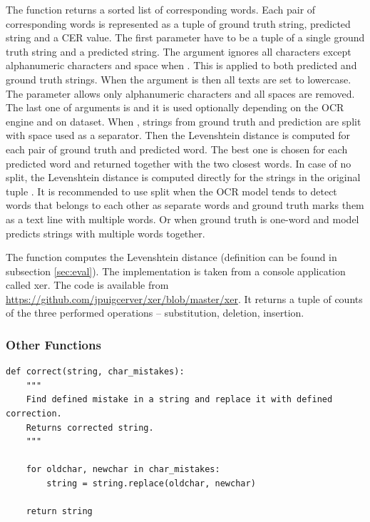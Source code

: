 The function  returns a sorted list of corresponding words. Each pair of corresponding words is represented as a tuple of ground truth string, predicted string and a CER value. The first parameter have to be a tuple of a single ground truth string and a predicted string. The argument  ignores all characters except alphanumeric characters and space when . This is applied to both predicted and ground truth strings. When the argument  is  then all texts are set to lowercase. The  parameter allows only alphanumeric characters and all spaces are removed. The last one of arguments is  and it is used optionally depending on the OCR engine and on dataset. When , strings from ground truth and prediction are split with space used as a separator. Then the Levenshtein distance is computed for each pair of ground truth and predicted word. The best one is chosen for each predicted word and returned together with the two closest words. In case of no split, the Levenshtein distance is computed directly for the strings in the original tuple . It is recommended to use split when the OCR model tends to detect words that belongs to each other as separate words and ground truth marks them as a text line with multiple words. Or when ground truth is one-word and model predicts strings with multiple words together.

The function  computes the Levenshtein distance (definition can be found in subsection \ref*{sec:eval}). The implementation is taken from a console application called xer. The code is available from \url{https://github.com/jpuigcerver/xer/blob/master/xer}. It returns a tuple of counts of the three performed operations --  substitution, deletion, insertion.

\subsubsection*{Other Functions}

\begin{lstlisting}[caption=correct]
def correct(string, char_mistakes):
    """
    Find defined mistake in a string and replace it with defined correction.
    Returns corrected string.
    """
    
    for oldchar, newchar in char_mistakes:
        string = string.replace(oldchar, newchar)

    return string
\end{lstlisting}   

